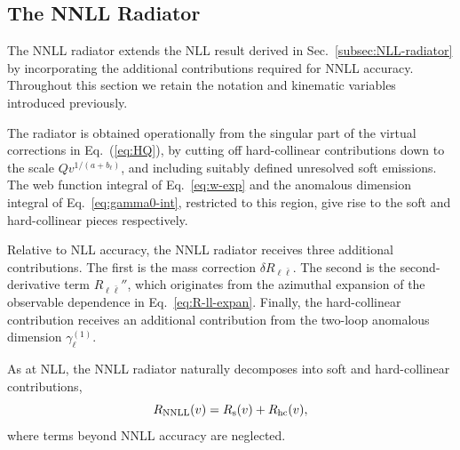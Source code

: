 \subsection{The NNLL Radiator}
\label{sec:radiator}

The NNLL radiator extends the NLL result derived in
Sec.~\ref{subsec:NLL-radiator} by incorporating the additional
contributions required for NNLL accuracy. Throughout this section we
retain the notation and kinematic variables introduced previously.

The radiator is obtained operationally from the singular part of the virtual corrections in
Eq.~(\ref{eq:HQ}), by cutting off hard-collinear contributions down to
the scale $Qv^{1/(a+b_\ell)}$, and including suitably defined
unresolved soft emissions.  The web function integral of Eq.~\eqref{eq:w-exp} and the anomalous
dimension integral of Eq.~\eqref{eq:gamma0-int}, restricted to this
region, give rise to the soft and hard-collinear pieces
respectively.

Relative to NLL accuracy, the NNLL radiator receives three additional
contributions. The first is the mass correction
$\delta R_{\ell\bar\ell}$. 
 The second is the second-derivative term $R_{\ell\bar\ell}''$, which originates from the azimuthal
expansion of the observable dependence in Eq.~\eqref{eq:R-ll-expan}. 
Finally, the hard-collinear contribution receives an additional contribution from the two-loop
anomalous dimension $\gamma_\ell^{(1)}$.

As at NLL, the NNLL radiator naturally decomposes into soft and
hard-collinear contributions,
\begin{equation}
  \label{eq:radiator-NNLL}
  R_{\rm NNLL}(v)=R_{\rm s}(v)+R_{\rm hc}(v),
\end{equation}
where  terms beyond NNLL accuracy are neglected.
  
